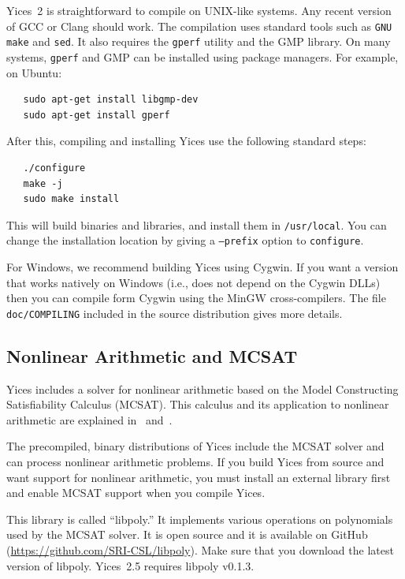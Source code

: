 \documentclass[11pt,twoside,fleqn,openright,titlepage]{cslreport}
\begin{document}
Yices~2 is straightforward to compile on UNIX-like systems. Any recent
version of GCC or Clang should work. The compilation uses standard
tools such as \texttt{GNU make} and \texttt{sed}. It also requires the
\texttt{gperf} utility and the GMP library. On many systems,
\texttt{gperf} and GMP can be installed using package
managers.  For example, on Ubuntu:
\begin{small}
\begin{verbatim}
   sudo apt-get install libgmp-dev
   sudo apt-get install gperf
\end{verbatim}
\end{small}
After this, compiling and installing Yices use the following standard steps:
\begin{small}
\begin{verbatim}
   ./configure
   make -j
   sudo make install
\end{verbatim}
\end{small}
This will build binaries and libraries, and install them in \texttt{/usr/local}.
You can change the installation location by giving a \texttt{--prefix} option
to \texttt{configure}.

For Windows, we recommend building Yices using Cygwin. If you want a
version that works natively on Windows (i.e., does not depend on the
Cygwin DLLs) then you can compile form Cygwin using the MinGW
cross-compilers.  The file \texttt{doc/COMPILING} included in the
source distribution gives more details.


\subsection{Nonlinear Arithmetic and MCSAT}
\label{mcsat-install}

Yices includes a solver for nonlinear arithmetic based on the Model
Constructing Satisfiability Calculus (MCSAT). This calculus and its
application to nonlinear arithmetic are explained
in~\cite{Jovanovic-etal:MCSATb:2013}
and~\cite{deMouraJovanovic:nla:2012}.

The precompiled, binary distributions of Yices include the MCSAT
solver and can process nonlinear arithmetic problems. If you build
Yices from source and want support for nonlinear arithmetic, you must
install an external library first and enable MCSAT support when you
compile Yices.

This library is called ``libpoly.'' It implements various operations
on polynomials used by the MCSAT solver. It is open source and it is
available on GitHub (\url{https://github.com/SRI-CSL/libpoly}). Make
sure that you download the latest version of libpoly. Yices~2.5
requires libpoly v0.1.3.
\end{document}
